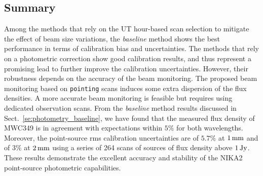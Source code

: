 \subsection{Summary}
\label{se:photometry_summary}
Among the methods that rely on the UT hour-based
scan selection to mitigate the effect of beam size variations, the
\emph{baseline} method shows the best performance in terms of calibration
bias and uncertainties. The methods that rely on a photometric correction
show good calibration results, and thus represent a promising lead
to further improve the calibration uncertainties. However, their
robustness depends on the accuracy of the beam monitoring. {\lp The
proposed beam monitoring based on {\tt pointing} scans induces some
extra dispersion of the flux densities. A more accurate beam monitoring is
feasible but requires using dedicated observation scans.} 
From the \emph{baseline} method results discussed in
Sect.~\ref{se:photometry_baseline}, we have found that the measured
flux density of MWC349 is in agreement with expectations within $5\%$
for both wavelengths. Moreover, the {\rev point-source} rms calibration
uncertainties are of $5.7\%$ at $1\,\rm{mm}$ and of $3\%$ at $2\,\rm{mm}$
using a series of 264 scans of sources of flux density above
$1\, \rm{Jy}$.
These results demonstrate the excellent accuracy and stability of the
NIKA2 {\rev point-source} photometric capabilities.





